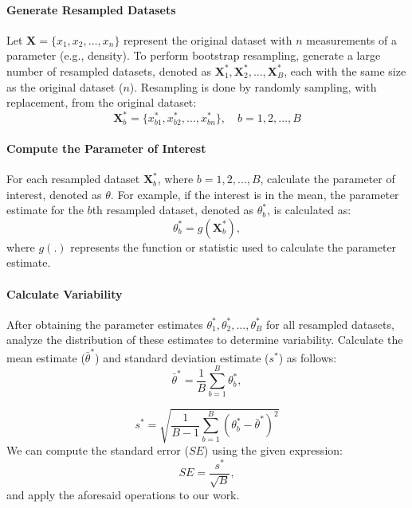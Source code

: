 \documentclass[conference]{IEEEtran}
\begin{document}
\paragraph{Generate Resampled Datasets}
Let $\mathbf{X} = \{x_1, x_2, \ldots, x_n\}$ represent the original dataset with $n$ measurements of a parameter (e.g., density). To perform bootstrap resampling, generate a large number of resampled datasets, denoted as $\mathbf{X}^{*}_1, \mathbf{X}^{*}_2, \ldots, \mathbf{X}^{*}_B$, each with the same size as the original dataset ($n$). Resampling is done by randomly sampling, with replacement, from the original dataset\cite{Chernick2007BootstrapMA}\cite{davison_hinkley_1997}\cite{Efron1994AnIT}\cite{article}:\begin{equation}\mathbf{X}^{*}_b = \{x^{*}_{b1}, x^{*}_{b2}, \ldots, x^{*}_{bn}\}, \quad b = 1, 2, \ldots, B\end{equation}
\paragraph{Compute the Parameter of Interest}
For each resampled dataset $\mathbf{X}^{*}_b$, where $b = 1, 2, \ldots, B$, calculate the parameter of interest, denoted as $\theta$. For example, if the interest is in the mean, the parameter estimate for the $b$th resampled dataset, denoted as $\theta^{*}_{b}$, is calculated as\cite{Chernick2007BootstrapMA}\cite{davison_hinkley_1997}\cite{Efron1994AnIT}\cite{article}:
\begin{equation}
\theta^{*}_{b} = g(\mathbf{X}^{*}_b),
\end{equation}
where $g(.)$ represents the function or statistic used to calculate the parameter estimate.
\paragraph{Calculate Variability}
After obtaining the parameter estimates $\theta^{*}_{1}, \theta^{*}_{2}, \ldots, \theta^{*}_{B}$ for all resampled datasets, analyze the distribution of these estimates to determine variability. Calculate the mean estimate ($\bar{\theta}^{*}$) and standard deviation estimate ($s^{*}$) as follows\cite{Chernick2007BootstrapMA}\cite{Efron1994AnIT}:
\begin{equation}
\bar{\theta}^{*} = \frac{1}{B}\sum_{b=1}^{B}\theta^{*}_{b},
\end{equation}

\begin{equation}
s^{*} = \sqrt{\frac{1}{B-1}\sum_{b=1}^{B}(\theta^{*}_{b} - \bar{\theta}^{*})^2}
\end{equation}
We can compute the standard error ($SE$) using the given expression\cite{Chernick2007BootstrapMA}\cite{davison_hinkley_1997}\cite{Efron1994AnIT}:
\begin{equation}
SE = \frac{s^{*}}{\sqrt{B}},
\end{equation}
and apply the aforesaid operations to our work.
\end{document}
